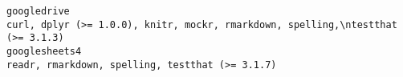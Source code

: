 \documentclass[
  letterpaper,
  DIV=11,
  numbers=noendperiod]{scrreprt}
\begin{document}
\begin{verbatim}
googledrive                                                                                                                                                                                                                                                                                                                                                                                                                                                                                                                                                                                                                                                                                                                                                                                                                                                                                                                                                                                                                                                                                                                                                                                                                   curl, dplyr (>= 1.0.0), knitr, mockr, rmarkdown, spelling,\ntestthat (>= 3.1.3)
googlesheets4                                                                                                                                                                                                                                                                                                                                                                                                                                                                                                                                                                                                                                                                                                                                                                                                                                                                                                                                                                                                                                                                                                                                                                                                                                                 readr, rmarkdown, spelling, testthat (>= 3.1.7)

\end{verbatim}
\end{document}

